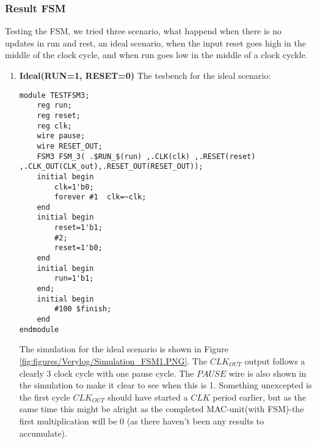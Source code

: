 \subsubsection{Result FSM}
Testing the FSM, we tried three scenario, what happend when there is no updates in run and rest, an ideal scenario, when the input reset goes high in the middle of the clock cycle, and when run goes low in the middle of a clock cyckle.

\begin{enumerate}
    \item \textbf{Ideal(RUN=1, RESET=0)}
    The tesbench for the ideal scenario:
    \begin{lstlisting}
module TESTFSM3;
	reg run;
	reg reset;
	reg clk;
	wire pause; 
	wire RESET_OUT;	
	FSM3 FSM_3( .$RUN_$(run) ,.CLK(clk) ,.RESET(reset) ,.CLK_OUT(CLK_out),.RESET_OUT(RESET_OUT));	
	initial begin
		clk=1'b0;
		forever #1	clk=~clk;
	end
	initial begin
		reset=1'b1;
		#2;
		reset=1'b0;	
	end	
	initial begin
		run=1'b1;	
	end;
	initial begin
		#100 $finish;
	end
endmodule
    \end{lstlisting}

    The simulation for the ideal scenario is shown in Figure \ref{fig:figures/Verylog/Simulation_FSM1.PNG}. The $CLK_{OUT}$ output follows a clearly 3 clock cycle with one pause cycle. The $PAUSE$ wire is also shown in the simulation to make it clear to see when this is 1. Something unexcepted is the first cycle $CLK_{OUT}$ should have started a $CLK$ period earlier, but as the same time this might be alright as the completed MAC-unit(with FSM)-the first multiplication will be 0 (as there haven’t been any results to accumulate).
    

\end{enumerate}
